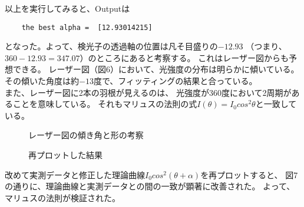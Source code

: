 \documentclass{article}
\begin{document}
\begin{spacing}{1.2}
    \indent %
    以上を実行してみると、Outputは
\end{spacing}

\begin{lstlisting} 
    the best alpha =  [12.93014215]
\end{lstlisting}

\begin{spacing}{1.2}
    \noindent %
    となった。よって、検光子の透過軸の位置は凡そ目盛りの$-12.93$
    （つまり、$360-12.93 = 347.07$）のところにあると考察する。
    これはレーザー図からも予想できる。
    レーザー図（図6）において、光強度の分布は明らかに傾いている。
    その傾いた角度は約$-13$度で、フィッティングの結果と合っている。\\
    また、レーザー図に2本の羽根が見えるのは、
    光強度が360度において2周期があることを意味している。
    それもマリュスの法則の式$I(\theta) = I_0cos^2\theta$と一致している。
    \begin{figure}[htbp]
        \centering
        \begin{minipage}[b]{0.5\textwidth} %
          \centering
          \caption{レーザー図の傾き角と形の考察}
          \label{fig:6}
        \end{minipage}%
        \begin{minipage}[b]{0.5\textwidth}
          \centering
          \caption{再プロットした結果}
          \label{fig:7}
        \end{minipage}
    \end{figure}
    \FloatBarrier
    改めて実測データと修正した理論曲線$I_0cos^2(\theta + \alpha)$を再プロットすると、
    図7の通りに、理論曲線と実測データとの間の一致が顕著に改善された。
    よって、マリュスの法則が検証された。
\end{spacing}
\end{document}
